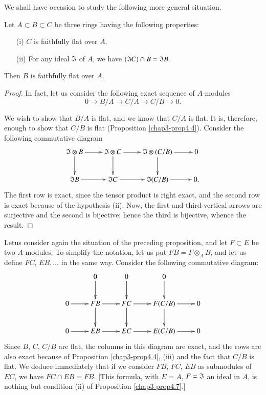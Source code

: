 We shall have occasion to study the following more general situation.

\begin{proposition}\label{chap3-prop4.7}
Let $A\subset B\subset C$ be three rings having the following properties:
\begin{itemize}
\item[\rm(i)] $C$ is faithfully flat over $A$.

\item[\rm(ii)] For any ideal $\mathfrak{I}$ of $A$, we have $(\mathfrak{I} C)\cap B=\mathfrak{I} B$.
\end{itemize}
Then $B$ is faithfully flat over $A$.
\end{proposition}

\begin{proof}
In fact, let us consider the following exact sequence of $A$-modules
$$
0\to B/A\to C/A\to C/B\to 0.
$$

We wish to show that $B/A$ is flat, and we know that $C/A$ is flat. It is, therefore, enough to show that $C/B$ is flat (Proposition \ref{chap3-prop4.4}). Consider the following commutative diagram
\[
\xymatrix{
\frakI\otimes B\ar[d]\ar[r] & \frakI\otimes C\ar[d]\ar[r] & \frakI\otimes (C/B)\ar[d]\ar[r] & 0\\
\frakI B\ar[r] & \frakI C\ar[r] & \frakI (C/B)\ar[r] & 0.
}
\]
The first row is exact, since the tensor product is right exact, and the second row is exact because of the hypothesis (ii). Now, the first and third vertical arrows are surjective and the second is bijective; hence the third is bijective, whence the result.
\end{proof}

\begin{remark}\label{chap3-rem4.8}
Let\pageoriginale us consider again the situation of the preceding proposition, and let $F\subset E$ be two $A$-modules. To simplify the notation, let us put $FB=F\otimes_{A}B$, and let us define $FC$, $EB,\ldots$ in the same way. Consider the following commutative diagram:
\[
\xymatrix{
 & 0\ar[d] & 0\ar[d] & 0\ar[d] & \\
0\ar[r] & FB\ar[d]\ar[r] & FC\ar[d]\ar[r] & F(C/B)\ar[d]\ar[r] & 0\\
0\ar[r] & EB\ar[r] & EC\ar[r] & E(C/B)\ar[r] & 0
}
\]
Since $B$, $C$, $C/B$ are flat, the columns in this diagram are exact, and the rows are also exact because of Proposition \ref{chap3-prop4.4}, (iii) and the fact that $C/B$ is flat. We deduce immediately that if we consider $FB$, $FC$, $EB$ as submodules of $EC$, we have $FC\cap EB=FB$. [This formula, with $E=A$, $F=\mathfrak{I}$ an ideal in $A$, is nothing but condition (ii) of Proposition \ref{chap3-prop4.7}.]
\end{remark}

